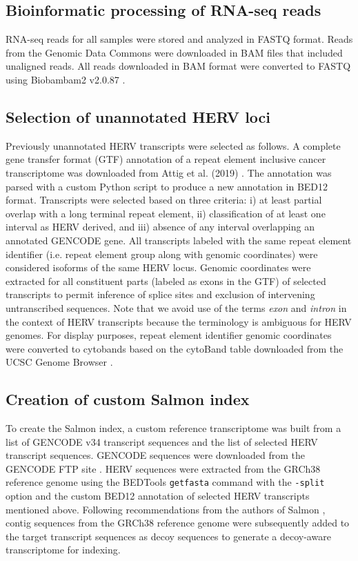 \subsection*{Bioinformatic processing of RNA-seq reads}
RNA-seq reads for all samples were stored and analyzed in FASTQ format.
Reads from the Genomic Data Commons were downloaded in BAM files that included unaligned reads.
All reads downloaded in BAM format were converted to FASTQ using Biobambam2 v2.0.87 \citep{Tischler2014}.

\subsection*{Selection of unannotated HERV loci}
Previously unannotated HERV transcripts were selected as follows.
A complete gene transfer format (GTF) \citep{GTF} annotation of a repeat element inclusive cancer transcriptome was downloaded from Attig et al. (2019) \citep{Attig2019}.
The annotation was parsed with a custom Python script to produce a new annotation in BED12 \citep{BED12} format.
Transcripts were selected based on three criteria: i) at least partial overlap with a long terminal repeat element, ii) classification of at least one interval as HERV derived, and iii) absence of any interval overlapping an annotated GENCODE gene.
All transcripts labeled with the same repeat element identifier (i.e. repeat element group along with genomic coordinates) were considered isoforms of the same HERV locus.
Genomic coordinates were extracted for all constituent parts (labeled as exons in the GTF) of selected transcripts to permit inference of splice sites and exclusion of intervening untranscribed sequences.
Note that we avoid use of the terms \emph{exon} and \emph{intron} in the context of HERV transcripts because the terminology is ambiguous for HERV genomes.
For display purposes, repeat element identifier genomic coordinates were converted to cytobands based on the cytoBand table downloaded from the UCSC Genome Browser \citep{Furey2003, Navarro2020}.

\subsection*{Creation of custom Salmon index}
To create the Salmon index, a custom reference transcriptome was built from a list of GENCODE v34 transcript sequences \citep{Frankish2018} and the list of selected HERV transcript sequences.
GENCODE sequences were downloaded from the GENCODE FTP site \citep{GENCODE-transcripts}.
HERV sequences were extracted from the GRCh38 reference genome \citep{ENCODE-GRCh38} using the BEDTools \verb|getfasta| command \citep{Quinlan2010} with the \verb|-split| option and the custom BED12 annotation of selected HERV transcripts mentioned above.
Following recommendations from the authors of Salmon \citep{SalmonDecoys}, contig sequences from the GRCh38 reference genome were subsequently added to the target transcript sequences as decoy sequences to generate a decoy-aware transcriptome for indexing.

